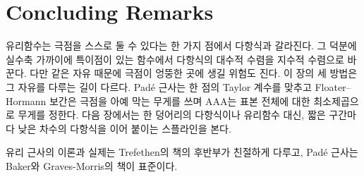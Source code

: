\section{Concluding Remarks}

유리함수는 극점을 스스로 둘 수 있다는 한 가지 점에서 다항식과 갈라진다. 그 덕분에 실수축 가까이에 특이점이 있는 함수에서 다항식의 대수적 수렴을 지수적 수렴으로 바꾼다. 다만 같은 자유 때문에 극점이 엉뚱한 곳에 생길 위험도 진다. 이 장의 세 방법은 그 자유를 다루는 길이 다르다. Padé 근사는 한 점의 Taylor 계수를 맞추고 Floater--Hormann 보간은 극점을 아예 막는 무게를 쓰며 AAA는 표본 전체에 대한 최소제곱으로 무게를 정한다. 다음 장에서는 한 덩어리의 다항식이나 유리함수 대신, 짧은 구간마다 낮은 차수의 다항식을 이어 붙이는 스플라인을 본다.

유리 근사의 이론과 실제는 Trefethen의 책\cite{trefethen2019atap}의 후반부가 친절하게 다루고, Padé 근사는 Baker와 Graves-Morris의 책\cite{baker1996pade}이 표준이다.

\chapterreferences
